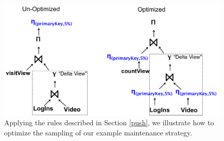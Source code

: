 \begin{figure}[t] \vspace{-2em}
\centering
 \includegraphics[scale=0.20]{figs/example_expression_tree_2.pdf} \vspace{-.5em}
 \caption{Applying the rules described in Section \ref{push}, we illustrate how to optimize the sampling of our example maintenance strategy. \label{exexpr2}}\vspace{-1.75em}
\end{figure}




